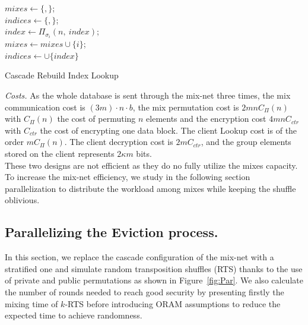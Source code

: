 \documentclass[USenglish,oneside,twocolumn]{article}
\begin{document}
\begin{algorithm}
\DontPrintSemicolon
{}
$mixes \gets \{,\}$;\\
$indices \gets \{,\}$;\\
{
	$index \gets {\Pi}_{\sigma_i}(n,\ index)$;\\
	$mixes \gets mixes \cup \{i\}$;\\
	$indices \gets \cup \{index\}$
}
\caption{Cascade Rebuild Index Lookup}
\label{alg:CRIL}
\end{algorithm}

\noindent\textit{Costs.}
As the whole database is sent through the mix-net three times, the mix communication cost is $ (3m) \cdot n \cdot b$, the mix permutation cost is $2mn C_{\Pi}(n)$ with $C_{\Pi}(n)$ the cost of permuting $n$ elements and the encryption cost $4 m n C_{ctr}$ with $C_{ctr}$ the cost of encrypting one data block. The client Lookup cost is of the order $m C_{\Pi}(n)$. The client decryption cost is $2mC_{ctr}$, and the group elements stored on the client represents $2\kappa m$ bits.\\

These two designs are not efficient as they do no fully utilize the mixes capacity. To increase the mix-net efficiency, we study in the following section parallelization to distribute the workload among mixes while keeping the shuffle oblivious.
% 
\subsection{Parallelizing the Eviction process.}\label{Parallel}
In this section, we replace the cascade configuration of the mix-net with a stratified one and simulate random transposition shuffles (RTS) thanks to the use of private and public permutations as shown in Figure~\ref{fig:Par}. We also calculate the number of rounds needed to reach good security by presenting firstly the mixing time of $k$-RTS before introducing ORAM assumptions to reduce the expected time to achieve randomness.

\end{document}
